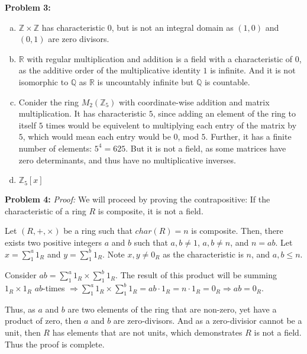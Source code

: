 \documentclass[12pt, letterpaper]{article}
\newenvironment{problem}
    [1]
    {\noindent \textbf{Problem #1:}}
    {\vspace{3mm}}
\begin{document}
\begin{problem}{3}
    \begin{enumerate}[(a)]
        \item $\mathbb{Z} \times \mathbb{Z}$ has characteristic $0$, but is not an integral domain
        as $(1, 0)$ and $(0, 1)$ are zero divisors.

        \item $\mathbb{R}$ with regular multiplication and addition is a field with a characteristic
        of $0$, as the additive order of the multiplicative identity $1$ is infinite. And it is not
        isomorphic to $\mathbb{Q}$ as $\mathbb{R}$ is uncountably infinite but $\mathbb{Q}$ is 
        countable.
        
        \item Conider the ring $M_2(\mathbb{Z}_5)$ with coordinate-wise addition and matrix 
        multiplication. It has characteristic $5$, since adding an element of the ring to itself
        $5$ times would be equivelent to multiplying each entry of the matrix by $5$, which would 
        mean each entry would be $0$, mod $5$. Further, it has a finite number of elements: 
        $5^4 = 625$. But it is not a field, as some matrices have zero determinants, and thus have 
        no multiplicative inverses.
        
        \item $\mathbb{Z}_5[x]$
    \end{enumerate}
\end{problem}

\begin{problem}{4}
    \emph{Proof:} We will proceed by proving the contrapositive: If the characteristic of a ring $R$
    is composite, it is not a field.

    \bigskip\noindent
    Let $(R, +, \times)$ be a ring such that $char(R) = n$ is composite. Then, there exists two 
    positive integers $a$ and $b$ such that $a,b \neq 1$, $a, b \neq n$, and $n = ab$. Let 
    $x = \sum_{1}^{a}1_R$ and $y = \sum_{1}^{b}1_R$. Note $x,y \neq 0_R$ as the characteristic is 
    $n$, and $a, b \le n$.

    \bigskip\noindent
    Consider $ab = \sum_{1}^{a}1_R \times \sum_{1}^{b}1_R$. The result of this product will be 
    summing $1_R \times 1_R$ $ab$-times $\Rightarrow \sum_{1}^{a}1_R \times \sum_{1}^{b}1_R = ab 
    \cdot 1_R = n \cdot 1_R = 0_R \Rightarrow ab = 0_R$.

    \bigskip\noindent
    Thus, as $a$ and $b$ are two elements of the ring that are non-zero, yet have a product of
    zero, then $a$ and $b$ are zero-divisors. And as a zero-divisior cannot be a unit, then 
    $R$ has elements that are not units, which demonstrates $R$ is not a field. Thus the proof
    is complete.
\end{problem}
\end{document}
